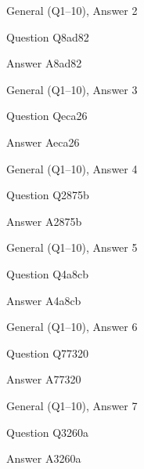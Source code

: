 \documentclass[11pt]{beamer}
\begin{document}
\begin{frame}[t]{General (Q1--10), Answer 2}
\vspace{2em}
\begin{block}{Question}
Q8ad82
\end{block}
\pause{}
\begin{block}{Answer}
A8ad82
\end{block}
\end{frame}
    

\begin{frame}[t]{General (Q1--10), Answer 3}
\vspace{2em}
\begin{block}{Question}
Qeca26
\end{block}
\pause{}
\begin{block}{Answer}
Aeca26
\end{block}
\end{frame}
    

\begin{frame}[t]{General (Q1--10), Answer 4}
\vspace{2em}
\begin{block}{Question}
Q2875b
\end{block}
\pause{}
\begin{block}{Answer}
A2875b
\end{block}
\end{frame}
    

\begin{frame}[t]{General (Q1--10), Answer 5}
\vspace{2em}
\begin{block}{Question}
Q4a8cb
\end{block}
\pause{}
\begin{block}{Answer}
A4a8cb
\end{block}
\end{frame}
    

\begin{frame}[t]{General (Q1--10), Answer 6}
\vspace{2em}
\begin{block}{Question}
Q77320
\end{block}
\pause{}
\begin{block}{Answer}
A77320
\end{block}
\end{frame}
    

\begin{frame}[t]{General (Q1--10), Answer 7}
\vspace{2em}
\begin{block}{Question}
Q3260a
\end{block}
\pause{}
\begin{block}{Answer}
A3260a
\end{block}
\end{frame}
    
\end{document}
